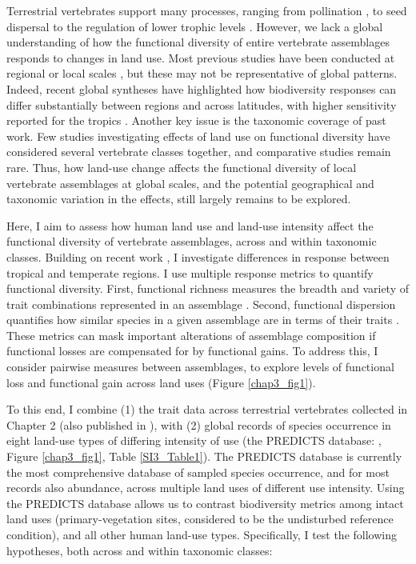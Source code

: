 Terrestrial vertebrates support many processes, ranging from pollination \citep{Ratto2018}, to seed dispersal to the regulation of lower trophic levels \citep{Barber2010, Letnic2012, Salo2010,Zhang2018}. However, we lack a global understanding of how the functional diversity of entire vertebrate assemblages responds to changes in land use. Most previous studies have been conducted at regional or local scales \citep{Davison2021}, but these may not be representative of global patterns. Indeed, recent global syntheses have highlighted how biodiversity responses can differ substantially between regions and across latitudes, with higher sensitivity reported for the tropics \citep{Matuoka2020,Millard2021, Newbold2020}. Another key issue is the taxonomic coverage of past work. Few studies investigating effects of land use on functional diversity have considered several vertebrate classes together, and comparative studies remain rare. Thus, how land-use change affects the functional diversity of local vertebrate assemblages at global scales, and the potential geographical and taxonomic variation in the effects, still largely remains to be explored.

Here, I aim to assess how human land use and land-use intensity affect the functional diversity of vertebrate assemblages, across and within taxonomic classes. Building on recent work \citep{Matuoka2020,Millard2021, Newbold2020}, I investigate differences in response between tropical and temperate regions. I use multiple response metrics to quantify functional diversity. First, functional richness measures the breadth and variety of trait combinations represented in an assemblage \citep{Legras2018}. Second, functional dispersion quantifies how similar species in a given assemblage are in terms of their traits \citep{Laliberte2010}. These metrics can mask important alterations of assemblage composition if functional losses are compensated for by functional gains. To address this, I consider pairwise measures between assemblages, to explore levels of functional loss and functional gain across land uses (Figure \ref{chap3_fig1}).



To this end, I combine (1) the trait data across terrestrial vertebrates collected in Chapter 2 (also published in \citet{Etard2020}), with (2) global records of species occurrence in eight land-use types of differing intensity of use (the PREDICTS database: \citet{Hudson2014, Hudson2017}, Figure \ref{chap3_fig1}, Table \ref{SI3_Table1}). The PREDICTS database is currently the most comprehensive database of sampled species occurrence, and for most records also abundance, across multiple land uses of different use intensity. Using the PREDICTS database allows us to contrast biodiversity metrics among intact land uses (primary-vegetation sites, considered to be the undisturbed reference condition), and all other human land-use types. Specifically, I test the following hypotheses, both across and within taxonomic classes:

